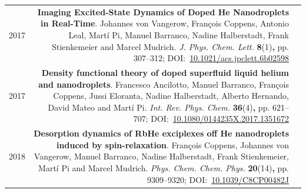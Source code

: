 \begin{tabular}{l!{\VRule}Rc}
		2017 & \textbf{Imaging Excited-State Dynamics of Doped He Nanodroplets in Real-Time}. Johannes von Vangerow, Fran\c{c}ois Coppens, Antonio Leal, Mart\'{i} Pi, Manuel Barranco, Nadine Halberstadt, Frank Stienkemeier and Marcel Mudrich. \emph{J. Phys. Chem. Lett.} \textbf{8}(1)\textbf{,} pp. 307--312; DOI:~\href{http://dx.doi.org/10.1021/acs.jpclett.6b02598}{10.1021/acs.jpclett.6b02598}&\vspace{20pt}\\
		2017 & \textbf{Density functional theory of doped superfluid liquid helium and nanodroplets}. Francesco Ancilotto, Manuel Barranco, Fran\c{c}ois Coppens, Jussi Eloranta, Nadine Halberstadt, Alberto Hernando, David Mateo and Mart\'{i} Pi. \emph{Int. Rev. Phys. Chem.} \textbf{36}(4)\textbf{,} pp. 621--707; DOI:~\href{http://dx.doi.org/10.1080/0144235X.2017.1351672}{10.1080/0144235X.2017.1351672}&\vspace{20pt}\\
		2018 & \textbf{Desorption dynamics of RbHe exciplexes off He nanodroplets induced by spin-relaxation}. Fran\c{c}ois Coppens, Johannes von Vangerow, Manuel Barranco, Nadine Halberstadt, Frank Stienkemeier, Mart\'{i} Pi and Marcel Mudrich. \emph{Phys. Chem. Chem. Phys.} \textbf{20}(14)\textbf{,} pp. 9309--9320; DOI:~\href{http://dx.doi.org/10.1039/C8CP00482J}{10.1039/C8CP00482J}&
		\end{tabular}